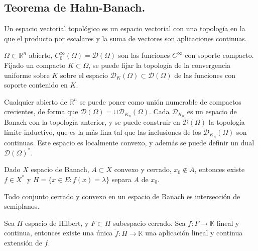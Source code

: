 \subsection{Teorema de Hahn-Banach.}

\begin{definition}
  Un espacio vectorial topológico es un espacio vectorial con una topología en
  la que el producto por escalares y la suma de vectores son aplicaciones
  continuas.
\end{definition}

\begin{example}
  $\Omega \subset \mathbb{R}^n$ abierto,
  $C^\infty_0(\Omega)=\mathcal{D}(\Omega)$ son las funciones $C^\infty$ con
  soporte compacto. Fijado un compacto $K\subset \Omega$, se puede fijar la
  topología de la convergencia uniforme sobre $K$ sobre el espacio
  $\mathcal{D}_K(\Omega)\subset \mathcal{D}(\Omega)$ de las funciones con
  soporte contenido en $K$.

  Cualquier abierto de $\mathbb{R}^n$ se puede poner como unión numerable de
  compactos crecientes, de forma que $\mathcal{D}(\Omega)=\cup
  \mathcal{D}_{K_n}(\Omega)$. Cada $\mathcal{D}_{K_n}$ es un espacio de Banach
  con la topología anterior, y se puede construir en $\mathcal{D}(\Omega)$ la
  topología límite inductivo, que es la más fina tal que las inclusiones de los
  $\mathcal{D}_{K_n}(\Omega)$ son continuas. Este espacio es localmente convexo,
  y además se puede definir un dual $\mathcal{D}(\Omega)^*$.
\end{example}

\begin{theorem}
  Dado $X$ espacio de Banach, $A \subset X$ convexo y cerrado, $x_0\not\in A$,
  entonces existe $f\in X^*$ y $H=\{x\in E:f(x)=\lambda\} $ separa $A$ de $x_0$.
\end{theorem}

\begin{corollary}
  Todo conjunto cerrado y convexo en un espacio de Banach es intersección de
  semiplanos.
\end{corollary}

\begin{theorem}
  Sea $H$ espacio de Hilbert, y $F\subset H$  subespacio cerrado. Sea $f:F\to
  \mathbb{K}$ lineal y continua, entonces existe una única $\tilde f:H\to
  \mathbb{K}$ una aplicación lineal y continua extensión de $f$.
\end{theorem}

